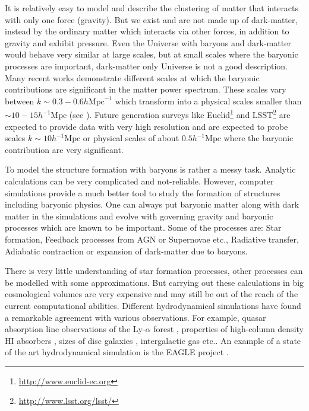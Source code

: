\documentclass[
  11pt,
  twoside,
  openright,
  titlepage,
  headings=optiontoheadandtoc
]{scrbook}
\begin{document}
It is relatively easy to model and describe the clustering of matter that interacts with only 
one force (gravity). But we exist and are not made up of dark-matter, instead by the
ordinary matter which interacts via other forces, in addition to gravity and exhibit pressure. 
Even the Universe with baryons and dark-matter would behave very similar at large scales,
but at small scales where the baryonic processes are important, dark-matter only Universe is
not a good description. Many recent works demonstrate different scales at which the baryonic
contributions are significant in the matter power spectrum. These scales vary between
$k\sim 0.3-0.6 h \mathrm{Mpc}^{-1}$ which transform into a physical scales smaller than
$\sim 10-15 h^{-1} \mathrm{Mpc}$ (see \cite{2011MNRAS.415.3649V,2014MNRAS.440.2997V}). 
Future generation surveys like Euclid\footnote{\url{http://www.euclid-ec.org}} 
\cite{2010arXiv1001.0061R,2013LRR....16....6A} and LSST\footnote{\url{http://www.lsst.org/lsst/}} 
\cite{2009arXiv0912.0201L} are
expected to provide data with very high resolution and are expected to probe scales 
$k \sim 10 h^{-1}\mathrm{Mpc}$
or physical scales of about $0.5 h^{-1} \mathrm{Mpc}$ where the baryonic contribution 
are very significant.

To model the structure formation with baryons is rather a messy task. Analytic calculations
can be very complicated and not-reliable. 
However, computer simulations provide a much better tool to study the
formation of structures including baryonic physics. 
One can always
put baryonic matter along with dark matter in the simulations and evolve with governing gravity and
baryonic processes which are known to be important. Some of the processes are: 
Star formation,
Feedback processes from AGN or Supernovae etc.,
Radiative transfer,
Adiabatic contraction or expansion of dark-matter due to baryons.

There is very little understanding of star formation processes, other processes can be 
modelled with some approximations. But carrying out these calculations in big cosmological 
volumes are very expensive and may still be out of the reach of the current computational 
abilities. 
Different hydrodynamical simulations have found a remarkable agreement
with various observations. For example, quasar absorption line observations
of the Ly-$\alpha$ forest \cite{1994ApJ...437L...9C,1998MNRAS.297L..49T,1998ApJ...495...44C}, 
properties of high-column density HI absorbers \cite{2008MNRAS.390.1349P,
2011ApJ...743...82M,2013MNRAS.430.2427R}, sizes of disc galaxies \cite{2004ApJ...607..688G,
2011MNRAS.410.1391A,2011ApJ...742...76G,2013MNRAS.436.3031V,2014MNRAS.437.1750M}, intergalactic
gas \cite{2012MNRAS.420..829O,2012MNRAS.425.1270S} etc.. An example of a state of the art 
hydrodynamical simulation is the
EAGLE project \cite{2015MNRAS.446..521S}. 
\end{document}
